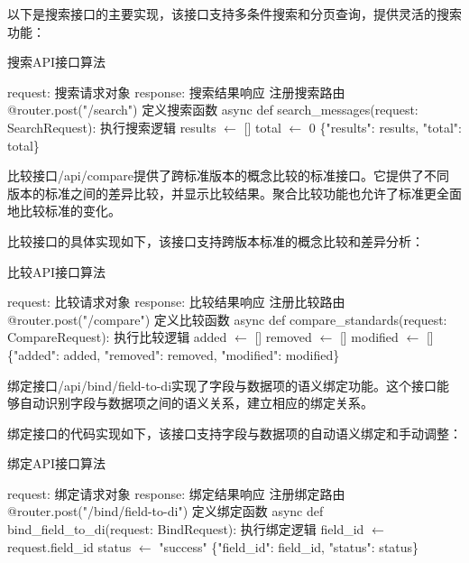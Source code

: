 以下是搜索接口的主要实现，该接口支持多条件搜索和分页查询，提供灵活的搜索功能：

\begin{algorithm}[H]
\caption{搜索API接口算法}
\begin{algorithmic}[1]
\REQUIRE request: 搜索请求对象
\ENSURE response: 搜索结果响应
\STATE 注册搜索路由
\STATE @router.post("/search")
\STATE 定义搜索函数
\STATE async def search\_messages(request: SearchRequest):
\STATE     执行搜索逻辑
\STATE     results $\leftarrow$ []
\STATE     total $\leftarrow$ 0
\STATE     \RETURN \{"results": results, "total": total\}
\end{algorithmic}
\end{algorithm}

比较接口/api/compare提供了跨标准版本的概念比较的标准接口。它提供了不同版本的标准之间的差异比较，并显示比较结果。聚合比较功能也允许了标准更全面地比较标准的变化。

比较接口的具体实现如下，该接口支持跨版本标准的概念比较和差异分析：

\begin{algorithm}[H]
\caption{比较API接口算法}
\begin{algorithmic}[1]
\REQUIRE request: 比较请求对象
\ENSURE response: 比较结果响应
\STATE 注册比较路由
\STATE @router.post("/compare")
\STATE 定义比较函数
\STATE async def compare\_standards(request: CompareRequest):
\STATE     执行比较逻辑
\STATE     added $\leftarrow$ []
\STATE     removed $\leftarrow$ []
\STATE     modified $\leftarrow$ []
\STATE     \RETURN \{"added": added, "removed": removed, "modified": modified\}
\end{algorithmic}
\end{algorithm}

绑定接口/api/bind/field-to-di实现了字段与数据项的语义绑定功能。这个接口能够自动识别字段与数据项之间的语义关系，建立相应的绑定关系。

绑定接口的代码实现如下，该接口支持字段与数据项的自动语义绑定和手动调整：

\begin{algorithm}[H]
\caption{绑定API接口算法}
\begin{algorithmic}[1]
\REQUIRE request: 绑定请求对象
\ENSURE response: 绑定结果响应
\STATE 注册绑定路由
\STATE @router.post("/bind/field-to-di")
\STATE 定义绑定函数
\STATE async def bind\_field\_to\_di(request: BindRequest):
\STATE     执行绑定逻辑
\STATE     field\_id $\leftarrow$ request.field\_id
\STATE     status $\leftarrow$ "success"
\STATE     \RETURN \{"field\_id": field\_id, "status": status\}
\end{algorithmic}
\end{algorithm}

